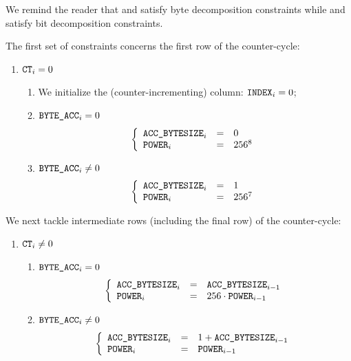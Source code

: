 \begin{center}
\end{center}

We remind the reader that
\genByte{} and \genByteAcc{} satisfy byte decomposition constraints while
\genBit{}  and \genBitAcc{}  satisfy bit  decomposition constraints.

The first set of constraints concerns the first row of the counter-cycle:
\begin{enumerate}
	\item \If $\texttt{CT}_{i}=0$ \Then
		\begin{enumerate}
			\item We initialize the (counter-incrementing) \index{} column: \( \texttt{INDEX}_{i} = 0 \);
			\item \If $\texttt{BYTE}\texttt{\_}\texttt{ACC}_{i} = 0$ \Then 
				\[
					\left\{ \begin{array}{lcl}
						\texttt{ACC\_BYTESIZE}_{i}      & = & 0       \\
						\texttt{POWER}_{i}   & = & 256^{8} \\
					\end{array} \right.
				\]
			\item \If $\texttt{BYTE}\texttt{\_}\texttt{ACC}_{i} \neq 0$ \Then
				\[
					\left\{ \begin{array}{lcl}
						\texttt{ACC\_BYTESIZE}_{i}      & = & 1       \\
						\texttt{POWER}_{i}   & = & 256^{7} \\
					\end{array} \right.
				\]
		\end{enumerate}
\end{enumerate}
We next tackle intermediate rows (including the final row) of the counter-cycle:
\begin{enumerate}[resume]
	\item \If $\texttt{CT}_{i} \neq 0$ \Then
		\begin{enumerate}
			\item \If $\texttt{BYTE}\texttt{\_}\texttt{ACC}_{i} = 0$ \Then
				\[
					\left\{ \begin{array}{lcl}
						\texttt{ACC\_BYTESIZE}_{i}      & = & \texttt{ACC\_BYTESIZE}_{i - 1}              \\
						\texttt{POWER}_{i}   & = & 256 \cdot \texttt{POWER}_{i - 1} \\
					\end{array} \right.
				\]
			\item \If $\texttt{BYTE}\texttt{\_}\texttt{ACC}_{i} \neq 0$ \Then
				\[
					\left\{ \begin{array}{lcl}
						\texttt{ACC\_BYTESIZE}_{i}      & = & 1 + \texttt{ACC\_BYTESIZE}_{i - 1} \\
						\texttt{POWER}_{i}   & = & \texttt{POWER}_{i - 1}  \\
					\end{array} \right.
				\]
		\end{enumerate}
\end{enumerate}
